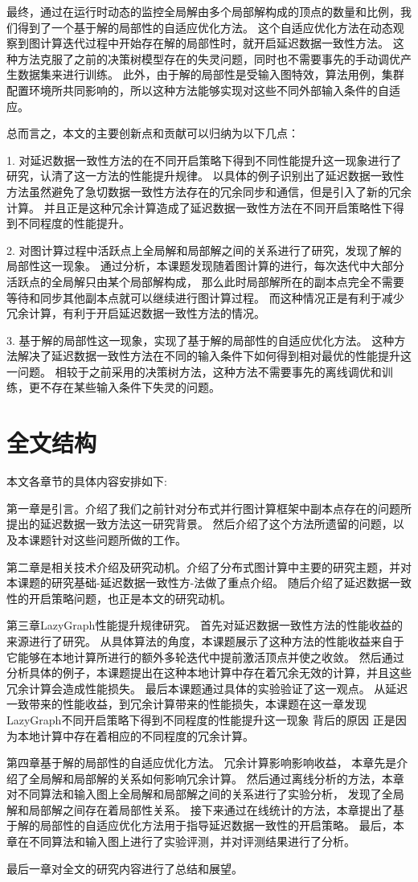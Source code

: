 最终，通过在运行时动态的监控全局解由多个局部解构成的顶点的数量和比例，我们得到了一个基于解的局部性的自适应优化方法。
这个自适应优化方法在动态观察到图计算迭代过程中开始存在解的局部性时，就开启延迟数据一致性方法。
这种方法克服了之前的决策树模型存在的失灵问题，同时也不需要事先的手动调优产生数据集来进行训练。
此外，由于解的局部性是受输入图特效，算法用例，集群配置环境所共同影响的，所以这种方法能够实现对这些不同外部输入条件的自适应。

总而言之，本文的主要创新点和贡献可以归纳为以下几点：

1. 对延迟数据一致性方法的在不同开启策略下得到不同性能提升这一现象进行了研究，认清了这一方法的性能提升规律。
以具体的例子识别出了延迟数据一致性方法虽然避免了急切数据一致性方法存在的冗余同步和通信，但是引入了新的冗余计算。
并且正是这种冗余计算造成了延迟数据一致性方法在不同开启策略性下得到不同程度的性能提升。

2. 对图计算过程中活跃点上全局解和局部解之间的关系进行了研究，发现了解的局部性这一现象。
通过分析，本课题发现随着图计算的进行，每次迭代中大部分活跃点的全局解只由某个局部解构成，
那么此时局部解所在的副本点完全不需要等待和同步其他副本点就可以继续进行图计算过程。
而这种情况正是有利于减少冗余计算，有利于开启延迟数据一致性方法的情况。

3. 基于解的局部性这一现象，实现了基于解的局部性的自适应优化方法。
这种方法解决了延迟数据一致性方法在不同的输入条件下如何得到相对最优的性能提升这一问题。
相较于之前采用的决策树方法，这种方法不需要事先的离线调优和训练，更不存在某些输入条件下失灵的问题。




\section{全文结构}
本文各章节的具体内容安排如下:

第一章是引言。介绍了我们之前针对分布式并行图计算框架中副本点存在的问题所提出的延迟数据一致方法这一研究背景。
然后介绍了这个方法所遗留的问题，以及本课题针对这些问题所做的工作。

第二章是相关技术介绍及研究动机。介绍了分布式图计算中主要的研究主题，并对本课题的研究基础-延迟数据一致性方-法做了重点介绍。
随后介绍了延迟数据一致性的开启策略问题，也正是本文的研究动机。

第三章LazyGraph性能提升规律研究。
首先对延迟数据一致性方法的性能收益的来源进行了研究。
从具体算法的角度，本课题展示了这种方法的性能收益来自于 它能够在本地计算所进行的额外多轮迭代中提前激活顶点并使之收敛。
然后通过分析具体的例子，本课题提出在这种本地计算中存在着冗余无效的计算，并且这些冗余计算会造成性能损失。
最后本课题通过具体的实验验证了这一观点。
从延迟一致带来的性能收益，到冗余计算带来的性能损失，本课题在这一章发现LazyGraph不同开启策略下得到不同程度的性能提升这一现象
背后的原因
正是因为本地计算中存在着相应的不同程度的冗余计算。

第四章基于解的局部性的自适应优化方法。
冗余计算影响影响收益，
本章先是介绍了全局解和局部解的关系如何影响冗余计算。
然后通过离线分析的方法，本章对不同算法和输入图上全局解和局部解之间的关系进行了实验分析，
发现了全局解和局部解之间存在着局部性关系。
接下来通过在线统计的方法，本章提出了基于解的局部性的自适应优化方法用于指导延迟数据一致性的开启策略。
最后，本章在不同算法和输入图上进行了实验评测，并对评测结果进行了分析。

最后一章对全文的研究内容进行了总结和展望。




